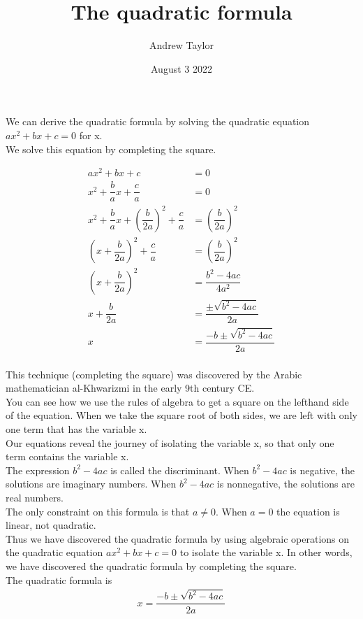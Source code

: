 \documentclass{article}
\title{The quadratic formula}
\author{Andrew Taylor}
\date{August 3 2022}
\begin{document}
\maketitle

We can derive the quadratic formula by solving the quadratic equation $ax^2 + bx + c = 0$ for x. \\

We solve this equation by completing the square.

\begin{align*}
ax^2 + bx + c &= 0 \\
x^2 + \dfrac{b}{a}x + \dfrac{c}{a} &= 0 \\
x^2 + \dfrac{b}{a}x + \left(\dfrac{b}{2a}\right)^2 + \dfrac{c}{a} &= \left(\dfrac{b}{2a}\right)^2 \\
\left(x + \dfrac{b}{2a}\right)^2 + \dfrac{c}{a} &= \left(\dfrac{b}{2a}\right)^2 \\
\left(x + \dfrac{b}{2a}\right)^2 &= \dfrac{b^2 - 4ac}{4a^2} \\
x + \dfrac{b}{2a} &= \dfrac{\pm \sqrt{b^2 - 4ac}}{2a} \\
x &= \dfrac{-b \pm \sqrt{b^2 - 4ac}}{2a} \\
\end{align*}

This technique (completing the square) was discovered by the Arabic mathematician al-Khwarizmi in the early 9th century CE. \\

You can see how we use the rules of algebra to get a square on the lefthand side of the equation. When we take the square root of both sides, we are left with only one term that has the variable x. \\

Our equations reveal the journey of isolating the variable x, so that only one term contains the variable x. \\

The expression $b^2 - 4ac$ is called the discriminant. When $b^2 - 4ac$ is negative, the solutions are imaginary numbers. When $b^2 - 4ac$ is nonnegative, the solutions are real numbers. \\

The only constraint on this formula is that $a \neq 0$. When $a = 0$ the equation is linear, not quadratic. \\

Thus we have discovered the quadratic formula by using algebraic operations on the quadratic equation $ax^2 + bx + c = 0$ to isolate the variable x. In other words, we have discovered the quadratic formula by completing the square. \\

The quadratic formula is \begin{align*}x = \dfrac{-b \pm \sqrt{b^2 - 4ac}}{2a}\end{align*}
\end{document}
